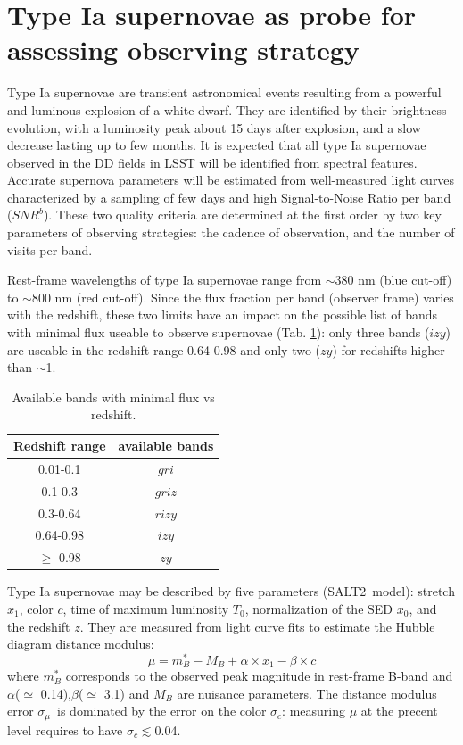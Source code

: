 \documentclass[\docopts]{\docclass}
\newcommand{\snrb}{\mbox{$SNR^b$}}
\newcommand{\z}{{$z$}}
\newcommand{\bg}{{$g$}}
\newcommand{\br}{{$r$}}
\newcommand{\bi}{{$i$}}
\newcommand{\bz}{{$z$}}
\newcommand{\by}{{$y$}}
\newcommand{\salt}{SALT2}
\newcommand{\xnorm}{$x_0$}
\newcommand{\strech}{$x_1$}
\newcommand{\col}{$c$}
\newcommand{\daymax}{$T_0$}
\newcommand{\sigc}{\mbox{$\sigma_c$}}
\newcommand{\sigmu}{\mbox{$\sigma_\mu$}}
\begin{document}
\section{Type Ia supernovae as probe for assessing observing strategy}
\label{sec:snprobes}
Type Ia supernovae are transient astronomical events resulting from a powerful and luminous explosion of a white dwarf. They are identified by their brightness evolution, with a luminosity peak about 15 days after explosion, and a slow decrease lasting up to few months. It is expected that all type Ia supernovae observed in the DD fields in LSST will be identified from spectral features. Accurate supernova parameters will be estimated from well-measured light curves characterized by a sampling of few days and high Signal-to-Noise Ratio per band (\snrb). These two quality criteria are determined at the first order by two key parameters of observing strategies: the cadence of observation, and the number of visits per band.
\par
Rest-frame wavelengths of type Ia supernovae range from $\sim$380 nm (blue cut-off) to $\sim$800 nm (red cut-off). Since the flux fraction per band (observer frame) varies with the redshift, these two limits have an impact on the possible list of bands with minimal flux useable to observe supernovae (Tab. \ref{tab:zfilters}): only three bands (\bi\bz\by) are useable in the redshift range 0.64-0.98 and only two (\bz\by) for redshifts higher than $\sim$1. 

\begin{table}[!htbp]
  \caption{Available bands with minimal flux vs redshift.}\label{tab:zfilters}
  \begin{center}
    \begin{tabular}{c|c}
      \hline
      \hline
      Redshift range & available bands \\
      \hline
      0.01-0.1 & \bg\br\bi\\
      0.1-0.3 & \bg\br\bi\bz \\
      0.3-0.64 & \br\bi\bz\by \\
      0.64-0.98 & \bi\bz\by \\
      $\geq$ 0.98 & \bz\by \\
      \hline
      \end{tabular}
  \end{center}
\end{table}

Type Ia supernovae may be described by five parameters (\salt~model): stretch\strech, color \col, time of maximum luminosity \daymax, normalization of the SED \xnorm, and the redshift \z.  They are measured from light curve fits to estimate the Hubble diagram distance modulus:
\begin{equation}
  \mu =m_B^*- M_B+\alpha \times x_1 -\beta \times c \label{eq:mu}
\end{equation}
where $m_B^*$ corresponds to the observed peak magnitude in rest-frame B-band and $\alpha$($\simeq$ 0.14),$\beta$($\simeq$ 3.1) and $M_B$ are nuisance parameters. The distance modulus error \sigmu~is dominated by the error on the color \sigc: measuring $\mu$ at the precent level  requires to have \sigc$\lesssim$0.04.
\end{document}
